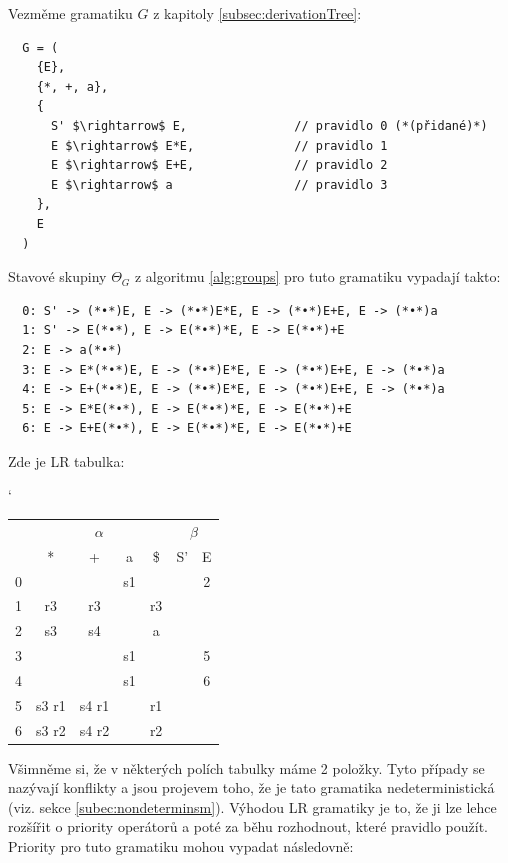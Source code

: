 \begin{exmp} Vezměme gramatiku $G$ z kapitoly \ref{subsec:derivationTree}:


\begin{lstlisting}
  G = (
    {E},
    {*, +, a},
    {
      S' $\rightarrow$ E,               // pravidlo 0 (*(přidané)*)
      E $\rightarrow$ E*E,              // pravidlo 1
      E $\rightarrow$ E+E,              // pravidlo 2
      E $\rightarrow$ a                 // pravidlo 3
    },
    E
  )
\end{lstlisting}

\noindent
Stavové skupiny $\Theta_G$ z algoritmu \ref{alg:groups} pro tuto gramatiku vypadají takto:
\begin{lstlisting}
  0: S' -> (*•*)E, E -> (*•*)E*E, E -> (*•*)E+E, E -> (*•*)a
  1: S' -> E(*•*), E -> E(*•*)*E, E -> E(*•*)+E
  2: E -> a(*•*)
  3: E -> E*(*•*)E, E -> (*•*)E*E, E -> (*•*)E+E, E -> (*•*)a
  4: E -> E+(*•*)E, E -> (*•*)E*E, E -> (*•*)E+E, E -> (*•*)a
  5: E -> E*E(*•*), E -> E(*•*)*E, E -> E(*•*)+E
  6: E -> E+E(*•*), E -> E(*•*)*E, E -> E(*•*)+E
\end{lstlisting}

\noindent
Zde je LR tabulka:

\begin{table}[H]
  \catcode`
  \centering
  \begin{tabular}{| c || c | c | c | c || c | c |}
    \hline
    \multirow{2}{*}{} & \multicolumn{4}{c||}{$\alpha$}& \multicolumn{2}{c|}{$\beta$} \\
    \cline{2-7}
      & * & + & a & \$& S'& E \\
    \hhline{|=||=|=|=|=||=|=|}
    0 &   &   & s1 &   &   & 2 \\
    \hline
    1 & r3 & r3 &   & r3 &   &   \\
    \hline
    2 & s3 & s4 &   & a &   &   \\
    \hline
    3 &   &   & s1 &   &   & 5 \\
    \hline
    4 &   &   & s1 &   &   & 6 \\
    \hline
    5 & s3 r1 &  s4 r1 & & r1 &   & \\
    \hline
    6 & s3 r2 &  s4 r2 & & r2 &   & \\
    \hline
  \end{tabular}
\end{table}

Všimněme si, že v některých polích tabulky máme 2 položky. Tyto případy
se nazývají  konflikty a jsou projevem toho, že je tato
gramatika nedeterministická (viz. sekce \ref{subec:nondeterminsm}).
Výhodou LR gramatiky je to, že ji lze lehce rozšířit o priority operátorů
a poté za běhu rozhodnout, které pravidlo použít.
Priority pro tuto gramatiku mohou vypadat následovně:


\end{exmp}
